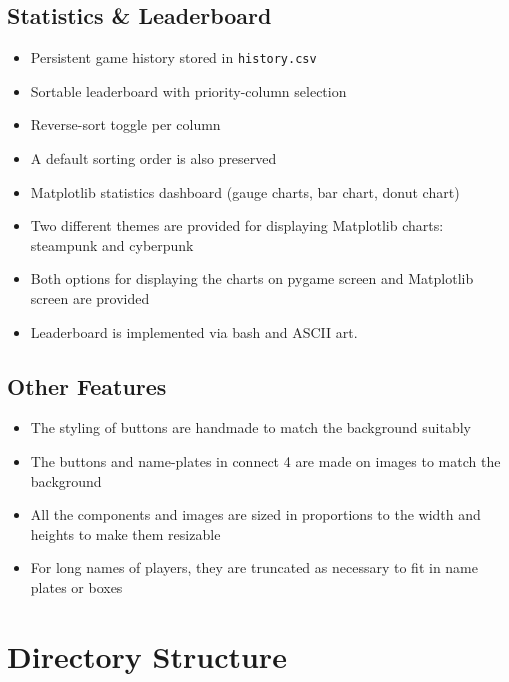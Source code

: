 \documentclass[12pt, a4paper]{article}
\begin{document}
\subsection{Statistics \& Leaderboard}
\begin{itemize}
    \item Persistent game history stored in \texttt{history.csv}
    \item Sortable leaderboard with priority-column selection
    \item Reverse-sort toggle per column
    \item A default sorting order is also preserved
    \item Matplotlib statistics dashboard (gauge charts, bar chart, donut chart)
    \item Two different themes are provided for displaying Matplotlib charts: steampunk and cyberpunk
    \item Both options for displaying the charts on pygame screen and Matplotlib screen are provided
    \item Leaderboard is implemented via bash and ASCII art.
   
\end{itemize}

\subsection{Other Features}
\begin{itemize}
    \item {The styling of buttons are handmade to match the background suitably}
    \item The buttons and name-plates in connect 4 are made on images to match the background
    \item All the components and images are sized in proportions to the width and heights to make them resizable
    \item For long names of players, they are truncated as necessary to fit in name plates or boxes
\end{itemize}

\newpage
\section{Directory Structure}
\end{document}
